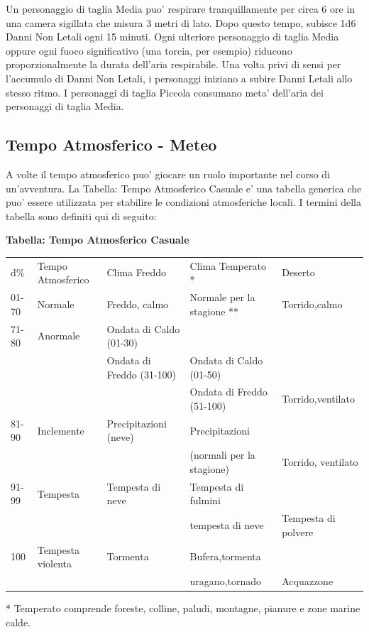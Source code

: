 \documentclass[a4paper,11pt,twoside,openany]{dndbook}
\begin{document}
{Un personaggio di taglia Media puo' respirare tranquillamente per circa 6 ore in una camera sigillata che misura 3 metri di lato. Dopo questo tempo, subisce 1d6 Danni Non Letali ogni 15 minuti. Ogni ulteriore personaggio di taglia Media oppure ogni fuoco significativo (una torcia, per esempio) riducono proporzionalmente la durata dell'aria respirabile. Una volta privi di sensi per l'accumulo di Danni Non Letali, i personaggi iniziano a subire Danni Letali allo stesso ritmo. I personaggi di taglia Piccola consumano meta' dell'aria dei personaggi di taglia Media.

\pagebreak

\subsection{Tempo Atmosferico - Meteo}

\label{tempo-atmosferico---meteo}

A volte il tempo atmosferico puo' giocare un ruolo importante nel corso di un'avventura. La Tabella: Tempo Atmosferico Casuale e' una tabella generica che puo' essere utilizzata per stabilire le condizioni atmosferiche locali. I termini della tabella sono definiti qui di seguito:

\bigskip

\textbf{Tabella: Tempo Atmosferico Casuale}

{\small
\begin{tabular}[c]{@{}lllll@{}}
\toprule 
d\% & Tempo Atmosferico & Clima Freddo & Clima Temperato {*} & Deserto\tabularnewline
01-70 & Normale & Freddo, calmo & Normale per la stagione {*}{*} & Torrido,calmo\tabularnewline
71-80 & Anormale & Ondata di Caldo (01-30) \\
&& Ondata di Freddo (31-100) & Ondata di Caldo (01-50)\\
&&& Ondata di Freddo (51-100) & Torrido,ventilato\tabularnewline
81-90 & Inclemente & Precipitazioni (neve) & Precipitazioni \\
&&&(normali per la stagione) & Torrido, ventilato\tabularnewline
91-99 & Tempesta & Tempesta di neve & Tempesta di fulmini\\
&&& tempesta di neve & Tempesta di polvere\tabularnewline
100 & Tempesta violenta & Tormenta & Bufera,tormenta\\
&&&uragano,tornado & Acquazzone\tabularnewline
\bottomrule
\end{tabular}}
{*} Temperato comprende foreste, colline, paludi, montagne, pianure
e zone marine calde.

}
\end{document}
